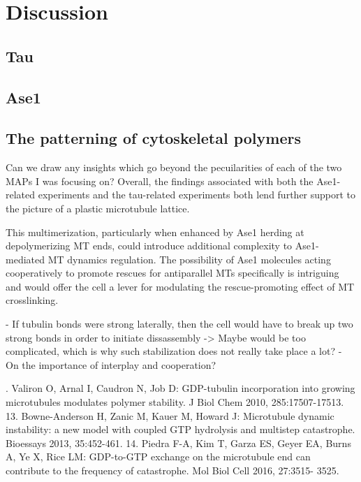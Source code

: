 \chapter{Discussion}
\section{Tau}

\section{Ase1}


\section{The patterning of cytoskeletal polymers}
Can we draw any insights which go beyond the pecuilarities of each of the two MAPs I was focusing on? Overall, the findings associated with both the Ase1-related experiments and the tau-related experiments both lend further support to the picture of a plastic microtubule lattice. 

This multimerization, particularly when enhanced by Ase1 herding at depolymerizing MT ends, could introduce additional complexity to Ase1-mediated MT dynamics regulation. The possibility of Ase1 molecules acting cooperatively to promote rescues for antiparallel MTs specifically is intriguing and would offer the cell a lever for modulating the rescue-promoting effect of MT crosslinking.


- If tubulin bonds were strong laterally, then the cell would have to break up two strong bonds in order to initiate dissassembly -> Maybe would be too complicated, which is why such stabilization does not really take place a lot?
- On the importance of interplay and cooperation?

. Valiron O, Arnal I, Caudron N, Job D: GDP-tubulin incorporation
into growing microtubules modulates polymer stability. J Biol
Chem 2010, 285:17507-17513.
13. Bowne-Anderson H, Zanic M, Kauer M, Howard J: Microtubule
dynamic instability: a new model with coupled GTP hydrolysis
and multistep catastrophe. Bioessays 2013, 35:452-461.
14. Piedra F-A, Kim T, Garza ES, Geyer EA, Burns A, Ye X, Rice LM:
GDP-to-GTP exchange on the microtubule end can contribute
to the frequency of catastrophe. Mol Biol Cell 2016, 27:3515-
3525.
